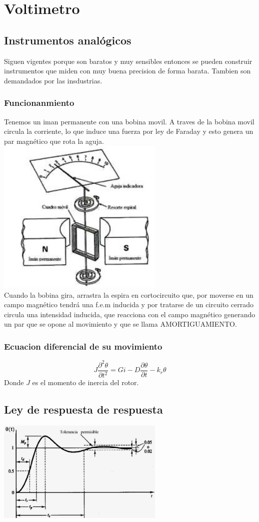 \documentclass{report}
\begin{document}
\chapter{Voltimetro}

\section{Instrumentos analógicos}
Siguen vigentes porque son baratos y muy sensibles entonces se pueden construir instrumentos que miden con muy buena precision de forma barata.
Tambien son demandados por las insdustrias.

\subsection{Funcionanmiento}
Tenemos un iman permanente con una bobina movil. A traves de la bobina movil circula la corriente, lo que induce una fuerza por ley de Faraday y esto genera un par magnético que rota la aguja. \\
\includegraphics[width=8cm]{../Assets/voltimetro.png} \\
Cuando la bobina gira, arrastra la espira en cortocircuito que, por moverse en un campo magnético tendrá una f.e.m inducida y por tratarse de un circuito cerrado circula una intensidad inducida, que reacciona con el campo magnético generando un par que se opone al movimiento y que se llama AMORTIGUAMIENTO.

\subsection{Ecuacion diferencial de su movimiento}
\[
	J \frac{\partial^2{\theta}}{\partial{t^2}} = Gi - D \frac{\partial{\theta}}{\partial{t}} - k_r\theta
\]
Donde $J$ es el momento de inercia del rotor.

\section{Ley de respuesta de respuesta}
\includegraphics[width=8cm]{../Assets/instrumentos_analogicos_ley_de_respuesta.png}
\end{document}
